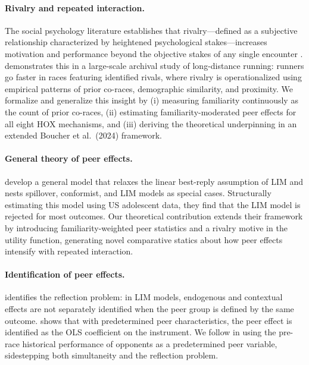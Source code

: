 \documentclass[12pt]{article}
\theoremstyle{definition}
\theoremstyle{remark}
\begin{document}
\paragraph{Rivalry and repeated interaction.}
The social psychology literature establishes that rivalry---defined as a subjective
relationship characterized by heightened psychological stakes---increases motivation
and performance beyond the objective stakes of any single encounter
\citep{KilduffElfenbeinStaw2010}.
\citet{Kilduff2014} demonstrates this in a large-scale archival study of
long-distance running: runners go faster in races featuring identified rivals,
where rivalry is operationalized using empirical patterns of prior co-races,
demographic similarity, and proximity.
We formalize and generalize this insight by (i) measuring familiarity continuously
as the count of prior co-races, (ii) estimating familiarity-moderated peer effects
for all eight HOX mechanisms, and (iii) deriving the theoretical underpinning
in an extended Boucher et al.\ (2024) framework.

\paragraph{General theory of peer effects.}
\citet{Boucher2024} develop a general model that relaxes the linear best-reply
assumption of LIM and nests spillover, conformist, and LIM models as special cases.
Structurally estimating this model using US adolescent data, they find that the LIM
model is rejected for most outcomes.
Our theoretical contribution extends their framework by introducing
familiarity-weighted peer statistics and a rivalry motive in the utility function,
generating novel comparative statics about how peer effects intensify with
repeated interaction.

\paragraph{Identification of peer effects.}
\citet{Manski1993} identifies the reflection problem: in LIM models, endogenous and
contextual effects are not separately identified when the peer group is defined
by the same outcome.
\citet{Angrist2014} shows that with predetermined peer characteristics, the peer
effect is identified as the OLS coefficient on the instrument.
We follow \citet{CornelissenDustmannSchonberg2017} in using the pre-race
historical performance of opponents as a predetermined peer variable, sidestepping
both simultaneity and the reflection problem.
\end{document}
